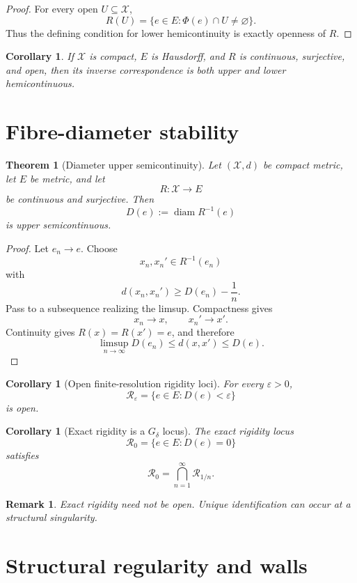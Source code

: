 \documentclass[11pt]{article}
\newtheorem{theorem}[definition]{Theorem}
\newtheorem{corollary}[definition]{Corollary}
\newtheorem{remark}[definition]{Remark}
\newcommand{\X}{\mathcal X}
\begin{document}
\begin{proof}
For every open \(U\subseteq\X\),
\[
R(U)
=
\{e\in E:\Phi(e)\cap U\neq\varnothing\}.
\]
Thus the defining condition for lower hemicontinuity is exactly openness of
\(R\).
\end{proof}

\begin{corollary}
If \(\X\) is compact, \(E\) is Hausdorff, and \(R\) is continuous, surjective,
and open, then its inverse correspondence is both upper and lower
hemicontinuous.
\end{corollary}

\section{Fibre-diameter stability}

\begin{theorem}[Diameter upper semicontinuity]
\label{thm:diam-usc}
Let \((\X,d)\) be compact metric, let \(E\) be metric, and let
\[
R:\X\to E
\]
be continuous and surjective. Then
\[
D(e):=\operatorname{diam}R^{-1}(e)
\]
is upper semicontinuous.
\end{theorem}

\begin{proof}
Let \(e_n\to e\). Choose
\[
x_n,x_n'\in R^{-1}(e_n)
\]
with
\[
d(x_n,x_n')
\ge D(e_n)-\frac1n.
\]
Pass to a subsequence realizing the limsup. Compactness gives
\[
x_n\to x,\qquad x_n'\to x'.
\]
Continuity gives \(R(x)=R(x')=e\), and therefore
\[
\limsup_{n\to\infty}D(e_n)
\le d(x,x')
\le D(e).
\]
\end{proof}

\begin{corollary}[Open finite-resolution rigidity loci]
For every \(\varepsilon>0\),
\[
\mathcal R_\varepsilon
=
\{e\in E:D(e)<\varepsilon\}
\]
is open.
\end{corollary}

\begin{corollary}[Exact rigidity is a \(G_\delta\) locus]
The exact rigidity locus
\[
\mathcal R_0
=
\{e\in E:D(e)=0\}
\]
satisfies
\[
\mathcal R_0
=
\bigcap_{n=1}^{\infty}\mathcal R_{1/n}.
\]
\end{corollary}

\begin{remark}
Exact rigidity need not be open. Unique identification can occur at a
structural singularity.
\end{remark}

\section{Structural regularity and walls}
\end{document}
